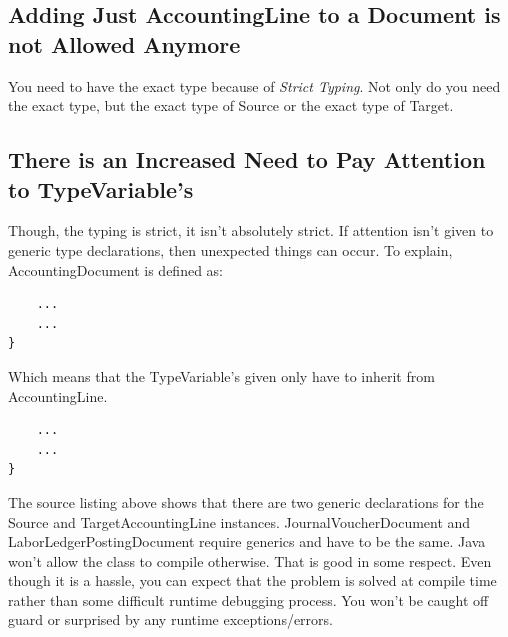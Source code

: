 \documentclass[12pt,notitlepage]{article}
\begin{document}
    \subsection{Adding Just \sf AccountingLine \rm to a \sf Document \rm is not Allowed Anymore}
    You need to have the exact type because of \emph{Strict Typing}. Not only do you need the exact type, but the exact type
    of \sf Source \rm or the exact type of \sf Target. \rm

    \subsection{There is an Increased Need to Pay Attention to \sf TypeVariable\rm 's}
    Though, the typing is strict, it isn't absolutely strict. If attention isn't given to generic type declarations, then unexpected things can occur. To explain, \sf AccountingDocument \rm is
    defined as:
    
    \begin{lstlisting}
    ...
    ...
}
    \end{lstlisting}
    Which means that the \sf TypeVariable\rm 's given only have to inherit from \sf AccountingLine.\rm 

    
    \begin{lstlisting}
    ...
    ...
}
  \end{lstlisting}
    The source listing above shows that there are two generic declarations for the \sf Source \rm and \sf TargetAccountingLine \rm instances. 
    \sf JournalVoucherDocument \rm and \sf LaborLedgerPostingDocument \rm require generics and have to be the same. Java won't allow the class
    to compile otherwise. That is good in some respect. Even though it is a hassle, you can expect that the problem is solved at compile time 
    rather than some difficult runtime debugging process. You won't be caught off guard or surprised by any runtime exceptions/errors.
\end{document}

